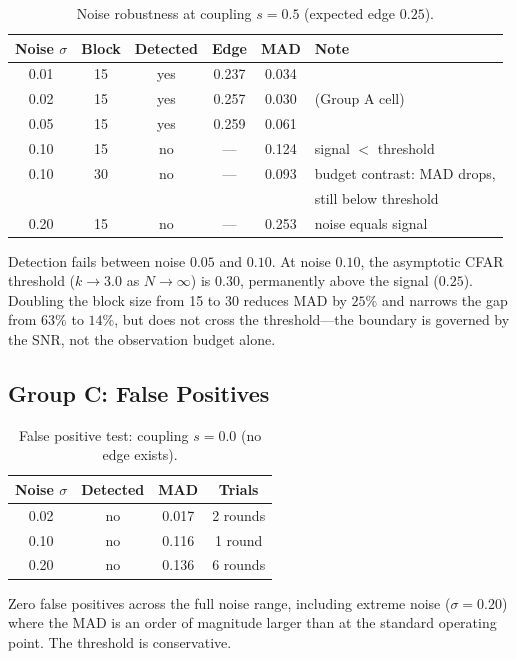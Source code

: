 \begin{table}[h]
\centering
\caption{Noise robustness at coupling $s = 0.5$ (expected edge $0.25$).}
\label{tab:noise}
\begin{tabular}{cccccl}
  \toprule
  Noise $\sigma$ & Block & Detected & Edge & MAD & Note \\
  \midrule
  0.01  & 15 & yes & 0.237 & 0.034 & \\
  0.02  & 15 & yes & 0.257 & 0.030 & (Group A cell) \\
  0.05  & 15 & yes & 0.259 & 0.061 & \\
  0.10  & 15 & no  & ---   & 0.124 & signal $<$ threshold \\
  0.10  & 30 & no  & ---   & 0.093 & budget contrast: MAD drops, \\
        &    &     &       &      & still below threshold \\
  0.20  & 15 & no  & ---   & 0.253 & noise equals signal \\
  \bottomrule
\end{tabular}
\end{table}

Detection fails between noise $0.05$ and $0.10$. At noise $0.10$,
the asymptotic CFAR threshold ($k \to 3.0$ as $N \to \infty$) is
$0.30$, permanently above the signal ($0.25$). Doubling the block
size from 15 to 30 reduces MAD by $25\%$ and narrows the gap from
$63\%$ to $14\%$, but does not cross the threshold---the boundary
is governed by the SNR, not the observation budget alone.

\subsection{Group C: False Positives}

\begin{table}[h]
\centering
\caption{False positive test: coupling $s = 0.0$ (no edge exists).}
\label{tab:fpr}
\begin{tabular}{cccc}
  \toprule
  Noise $\sigma$ & Detected & MAD & Trials \\
  \midrule
  0.02  & no & 0.017 & 2 rounds \\
  0.10  & no & 0.116 & 1 round \\
  0.20  & no & 0.136 & 6 rounds \\
  \bottomrule
\end{tabular}
\end{table}

Zero false positives across the full noise range, including extreme
noise ($\sigma = 0.20$) where the MAD is an order of magnitude larger
than at the standard operating point. The threshold is conservative.

